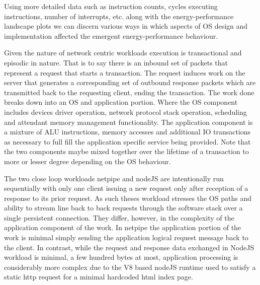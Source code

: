 Using more detailed data such as instruction counts, cycles executing instructions, number of interrupts, etc. along with the energy-performance landscape plots we can discern various ways in which aspects of OS design and implementation affected the emergent energy-performance behaviour.  

Given the nature of network centric workloads execution is transactional and episodic in nature.  That is to say there is an inbound set of packets that represent a request that starts a transaction.   The request induces work on the server that generates a corresponding set of outbound response packets which are transmitted back to the requesting client, ending the transaction.  The work done breaks down into an OS and application portion.  Where the OS component includes devices driver operation, network protocol stack operation, scheduling and attendant memory management functionality.   The application component is a mixture of ALU instructions, memory accesses and additional IO transactions as necessary to full fill the application specific service being provided.   Note that the two components maybe mixed together over the lifetime of a transaction to more or lesser degree depending on the OS behaviour.   

The two close loop workloads netpipe and nodeJS are intentionally run sequentially with only one client issuing a new request only after reception of a response to its prior request.  As such theses workload stresses the OS paths and ability to stream line back to back requests through the software stack over a single persistent connection.  They differ, however, in the complexity of the application component of the work.  In netpipe  the application portion of the work is minimal simply sending the application logical request message back to the client. In contrast, while the request and response data exchanged in NodeJS workload is minimal, a few hundred bytes at most, application processing is considerably more complex due to the V8 based nodeJS runtime used to satisfy a static http request for a minimal hardcoded html index page.  


